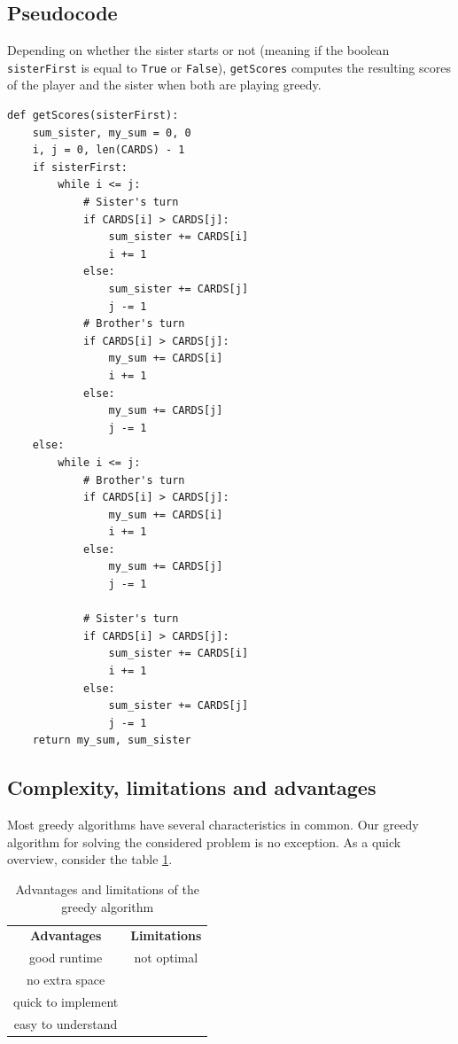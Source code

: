 \documentclass[a4paper,12pt,fleqn]{article}
\begin{document}
\subsection{Pseudocode}
Depending on whether the sister starts or not (meaning if the boolean \texttt{sisterFirst} is equal to \texttt{True} or \texttt{False}), \texttt{getScores} computes the resulting scores of the player and the sister when both are playing greedy.
\begin{verbatim}
def getScores(sisterFirst):
    sum_sister, my_sum = 0, 0
    i, j = 0, len(CARDS) - 1
    if sisterFirst:
        while i <= j:
            # Sister's turn
            if CARDS[i] > CARDS[j]:
                sum_sister += CARDS[i]
                i += 1
            else:
                sum_sister += CARDS[j]
                j -= 1
            # Brother's turn
            if CARDS[i] > CARDS[j]:
                my_sum += CARDS[i]
                i += 1
            else:
                my_sum += CARDS[j]
                j -= 1
    else:
        while i <= j:
            # Brother's turn
            if CARDS[i] > CARDS[j]:
                my_sum += CARDS[i]
                i += 1
            else:
                my_sum += CARDS[j]
                j -= 1

            # Sister's turn
            if CARDS[i] > CARDS[j]:
                sum_sister += CARDS[i]
                i += 1
            else:
                sum_sister += CARDS[j]
                j -= 1
    return my_sum, sum_sister
\end{verbatim}

\subsection{Complexity, limitations and advantages}
Most greedy algorithms have several characteristics in common. 
Our greedy algorithm for solving the considered problem is no exception. 
As a quick overview, consider the table \ref{tab:greedyAdLi}. 
\begin{table}[H]
    \centering
    \begin{tabular}{c|c}
        \textbf{Advantages} & \textbf{Limitations} \\
        good runtime & not optimal \\
        no extra space & \\
        quick to implement & \\
        easy to understand & \\
    \end{tabular}
    \caption{Advantages and limitations of the greedy algorithm}
    \label{tab:greedyAdLi}
\end{table}{}
\end{document}
